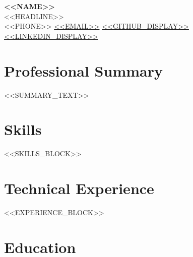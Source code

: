 \documentclass[10.9pt, letterpaper]{article}
\begin{document}
\begin{center}
  {\large\bfseries <<NAME>>}\\[2pt]
  {\small <<HEADLINE>>}\\[1pt]
  {\small
    <<PHONE>> \textbar{}
    \href{mailto:<<EMAIL>>}{<<EMAIL>>} \textbar{}
    \href{https://<<GITHUB_URL>>}{<<GITHUB_DISPLAY>>} \textbar{}
    \href{https://<<LINKEDIN_URL>>}{<<LINKEDIN_DISPLAY>>}
  }
\end{center}

\vspace{2pt}

\section{Professional Summary}

{\small <<SUMMARY_TEXT>>}

\vspace{-0.2em}

\section{Skills}

{\small
<<SKILLS_BLOCK>>
}
\medskip

\vspace{-0.8em}
\section{Technical Experience}

<<EXPERIENCE_BLOCK>>

\vspace{-0.1em}

\section{Education}
\end{document}
